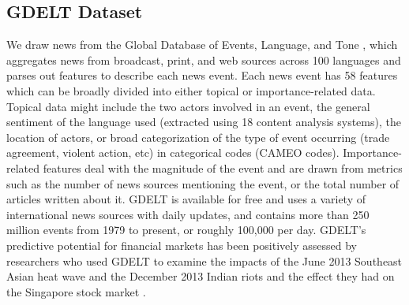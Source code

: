 \subsection{GDELT Dataset}
We draw news from the Global Database of Events, Language, and Tone \cite{GDELT}, which aggregates news from broadcast, print, and web sources across 100 languages and parses out features to describe each news event. Each news event has 58 features which can be broadly divided into either topical or importance-related data. Topical data might include the two actors involved in an event, the general sentiment of the language used (extracted using 18 content analysis systems), the location of actors, or broad categorization of the type of event occurring (trade agreement, violent action, etc) in categorical codes (CAMEO codes). Importance-related features deal with the magnitude of the event and are drawn from metrics such as the number of news sources mentioning the event, or the total number of articles written about it. GDELT is available for free and uses a variety of international news sources with daily updates, and contains more than 250 million events from 1979 to present, or roughly 100,000 per day. GDELT's predictive potential for financial markets has been positively assessed by researchers who used GDELT to examine the impacts of the June 2013 Southeast Asian heat wave and the December 2013 Indian riots and the effect they had on the Singapore stock market \cite{phua2014visual}.
